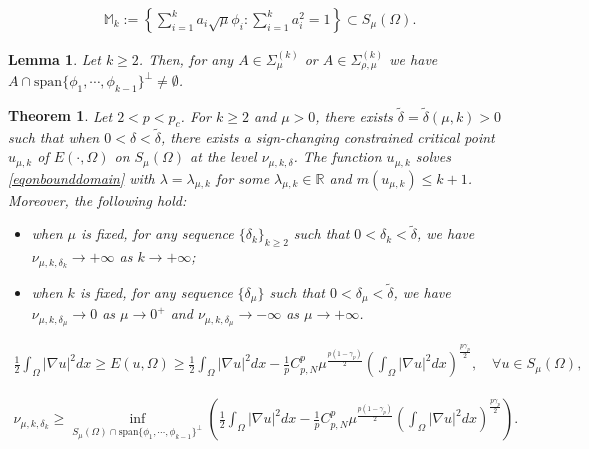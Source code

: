 \documentclass[10pt,a4paper]{amsart}
\newtheorem{theorem}{Theorem}
\newtheorem{lemma}{Lemma}
\newcommand{\R}{\mathbb{R}}
\newcommand{\ga}{\gamma}
\newcommand{\la}{\lambda}
\begin{document}
	\begin{align} \label{eqdefMk}
		\mathbb{M}_k := \left\{\sum_{i=1}^ka_i\sqrt{\mu}\phi_i: \sum_{i=1}^ka_i^2 = 1\right\} \subset S_\mu(\Omega).
	\end{align}

\begin{lemma} \label{lemnonempty}
	Let $k \geq 2$. Then, for any $A \in \Sigma_{\mu}^{(k)}$ or $A \in \Sigma_{\rho,\mu}^{(k)}$ we have $A \cap \text{span}\{\phi_1,\cdots,\phi_{k-1}\}^{\bot} \neq \emptyset$.
\end{lemma}

\begin{theorem} \label{thmgenussub}
	Let $2 < p < p_c$. For $k \geq 2$ and $\mu > 0$, there exists $\tilde \delta = \tilde \delta(\mu,k) > 0$ such that when $0 < \delta < \tilde \delta$, there exists a sign-changing constrained critical point $u_{\mu,k}$ of $E(\cdot,\Omega)$ on $S_\mu(\Omega)$ at the level $\nu_{\mu,k,\delta}$. The function $u_{\mu,k}$ solves \eqref{eqonbounddomain} with $\la = \la_{\mu,k}$ for some $\la_{\mu,k} \in \R$ and $m(u_{\mu,k}) \le k+1$. Moreover, the following hold:
	\begin{itemize}
		\item when $\mu$ is fixed, for any sequence $\{\delta_k\}_{k \ge 2}$ such that $0 < \delta_k < \tilde \delta$, we have $\nu_{\mu,k,\delta_k} \to +\infty$ as $k \to +\infty$;
		\item when $k$ is fixed, for any sequence $\{\delta_\mu\}$ such that $0 < \delta_\mu < \tilde \delta$, we have $\nu_{\mu,k,\delta_\mu} \to 0$ as $\mu \to 0^+$ and $\nu_{\mu,k,\delta_\mu} \to -\infty$ as $\mu \to +\infty$.
	\end{itemize}
\end{theorem}

	\begin{align} \label{eq5.3}
		\frac12 \int_\Omega |\nabla u|^2dx \ge E(u,\Omega) \geq \frac12 \int_\Omega |\nabla u|^2dx - \frac1p C_{p,N}^p \mu^{\frac{p(1-\ga_p)}{2}}\left( \int_\Omega |\nabla u|^2dx\right) ^{\frac{p\ga_p}{2}}, \quad \forall u \in S_\mu(\Omega),
	\end{align}

    \begin{align} \label{eq5.7}
    	\nu_{\mu,k,\delta_k} \geq \inf_{S_\mu(\Omega) \cap \text{span}\{\phi_1,\cdots,\phi_{k-1}\}^{\bot}}\left( \frac12 \int_\Omega |\nabla u|^2dx - \frac1p C_{p,N}^p \mu^{\frac{p(1-\ga_p)}{2}}\left( \int_\Omega |\nabla u|^2dx\right) ^{\frac{p\ga_p}{2}} \right).
    \end{align}
\end{document}

